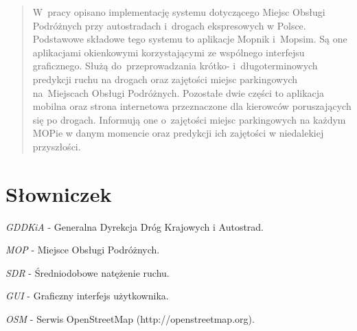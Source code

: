
\usepackage{graphicx}
\usepackage{hyperref}


\maketitle

\begin{abstract}
  W~pracy opisano implementację systemu dotyczącego Miejsc Obsługi Podróżnych
  przy autostradach i~drogach ekspresowych w Polsce. Podstawowe składowe tego
  systemu to aplikacje Mopnik i~Mopsim. Są one aplikacjami okienkowymi
  korzystającymi ze wspólnego interfejsu graficznego. Służą do~przeprowadzania
  krótko- i~długoterminowych predykcji ruchu na drogach oraz zajętości miejsc
  parkingowych na~Miejscach Obsługi Podróżnych. Pozostałe dwie części to
  aplikacja mobilna oraz strona internetowa przeznaczone dla kierowców
  poruszających się po drogach. Informują one o~zajętości miejsc parkingowych
  na każdym MOPie w danym momencie oraz predykcji ich zajętości w niedalekiej
  przyszłości.  
\end{abstract}

\tableofcontents

\chapter*{Słowniczek}\label{r:pojecia}

\begin{defi}\label{GDDKiA}
  \emph{GDDKiA} - Generalna Dyrekcja Dróg Krajowych i Autostrad.
\end{defi}

\begin{defi}\label{MOP}
  \emph{MOP} - Miejsce Obsługi Podróżnych.
\end{defi}

\begin{defi}\label{SDR}
  \emph{SDR} - Średniodobowe natężenie ruchu.
\end{defi}

\begin{defi}\label{GUI}
  \emph{GUI} - Graficzny interfejs użytkownika.
\end{defi}

\begin{defi}\label{OSM}
  \emph{OSM} - Serwis OpenStreetMap (http://openstreetmap.org).
\end{defi}

